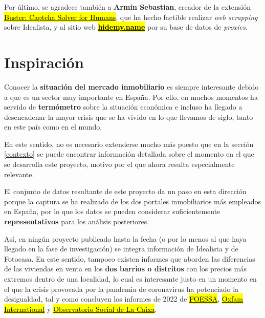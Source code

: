 \documentclass[12pt]{article}
\begin{document}
Por último, se agradece también a \textbf{Armin Sebastian}, creador de la extensión \href{https://chrome.google.com/webstore/detail/buster-captcha-solver-for/mpbjkejclgfgadiemmefgebjfooflfhl}{\hl{Buster: Captcha Solver for Humans}}, que ha hecho factible realizar \textit{web scrapping} sobre Idealista, y al sitio web \href{https://hidemy.name/proxy-list/}{\hl{\textbf{hidemy.name}}} por su base de datos de \textit{proxies}.

\vspace{-1.5em}\section{Inspiración}\vspace{-1em}

Conocer la \textbf{situación del mercado inmobiliario} es siempre interesante debido a que es un sector muy importante en España. Por ello, en muchos momentos ha servido de \textbf{termómetro} sobre la situación económica e incluso ha llegado a desencadenar la mayor crisis que se ha vivido en lo que llevamos de siglo, tanto en este país como en el mundo. 

En este sentido, no es necesario extenderse mucho más puesto que en la sección \ref{contexto} se puede encontrar información detallada sobre el momento en el que se desarrolla este proyecto, motivo por el que ahora resulta especialmente relevante.

El conjunto de datos resultante de este proyecto da un paso en esta dirección porque la captura se ha realizado de los dos portales inmobiliarios más empleados en España, por lo que los datos se pueden considerar suficientemente \textbf{representativos} para los análisis posteriores. 

Así, en ningún proyecto publicado hasta la fecha (o por lo menos al que haya llegado en la fase de investigación) se integra información de Idealista y de Fotocasa. En este sentido, tampoco existen informes que aborden las diferencias de las viviendas en venta en los \textbf{dos barrios o distritos} con los precios más extremos dentro de una localidad, lo cual es interesante justo en un momento en el que la crisis provocada por la pandemia de coronavirus ha potenciado la desigualdad, tal y como concluyen los informes de 2022 de \href{https://www.foessa.es/blog/foessa-presenta-la-primera-radiografia-social-completa-de-la-crisis-de-la-covid-19-en-toda-espana/}{\hl{FOESSA}}, \href{https://oxfamilibrary.openrepository.com/bitstream/handle/10546/621341/bp-inequality-kills-170122-es.pdf}{\hl{Oxfam International}} y \href{https://elobservatoriosocial.fundacionlacaixa.org/documents/22890/492074/T01_ID_ES_AyalaCant%C3%B3.pdf/a0746431-109f-e009-6c77-296c378f0438?t=1642072938395}{\hl{Observatorio Social de La Caixa}}.
\end{document}
